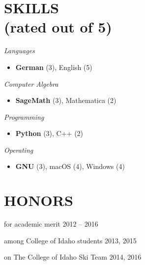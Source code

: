 \documentclass[margin]{res}
\newcommand\cs[1]{\textsl{#1} } \newcommand\ri[1]{\textsl{#1} }
\newenvironment{details}{\begin{itemize}[itemsep=0.6pt,topsep=2.2pt] }{\end{itemize} }
\begin{document}
\begin{resume}
\section{SKILLS\\(rated out of 5)}
\vspace{0pt}
\begin{multicols}{2}
	\parskip=0pt
    \cs{Languages}
    		\begin{details}
            	\item \textbf{German} (3), English (5)
        	\end{details}
    \cs{Computer Algebra} 
        	\begin{details}
            	\item \textbf{SageMath} (3), Mathematica (2)
            \end{details}
    \cs{Programming}
        	\begin{details}
            	\item \textbf{Python} (3), C++ (2)
            \end{details}
    \cs{Operating}
        	\begin{details}
            	\item \textbf{GNU} (3), macOS (4), Windows (4)
            \end{details}    
\end{multicols}

\section{HONORS}
\vspace{10pt}
	\begin{description}[noitemsep,topsep=0pt]
		\item[Heritage Scholarship] for academic merit \hfill 2012 -- 2016
    	\item[Top Putnam Score] among College of Idaho students \hfill 2013, 2015
        \item[Varsity Skier] on The College of Idaho Ski Team \hfill 2014, 2016
	\end{description}

\end{resume}
\end{document}
